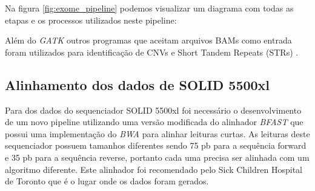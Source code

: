 Na figura \ref{fig:exome_pipeline} podemos visualizar um diagrama com todas as etapas e os processos utilizados neste pipeline:


Além do \textit{GATK} outros programas que aceitam arquivos BAMs como entrada foram utilizados para identificação de CNVs e  Short Tandem Repeats (STRs) \cite{Gymrek2012,Krumm2012a,Li2012}.

\subsection{Alinhamento dos dados de SOLID 5500xl}

Para dos dados do sequenciador SOLID 5500xl foi necessário o desenvolvimento de um novo pipeline utilizando uma versão modificada do alinhador \textit{BFAST} que possui uma implementação do \textit{BWA} para alinhar leituras curtas. As leituras deste sequenciador possuem tamanhos diferentes sendo 75 pb para a sequência forward e 35 pb para a sequência reverse, portanto cada uma precisa ser alinhada com um algoritmo diferente. Este alinhador foi recomendado pelo Sick Children Hospital de Toronto que é o lugar onde os dados foram gerados.

